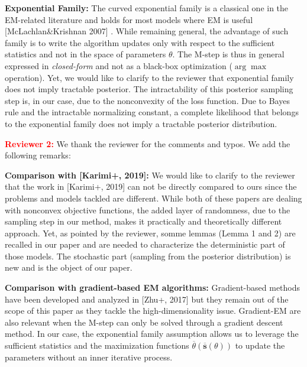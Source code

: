 \documentclass{article}
\begin{document}

\textbf{Exponential Family:} 
The curved exponential family is a classical one in the EM-related literature and holds for most models where  EM is useful [McLachlan\&Krishnan 2007] . 
While remaining general, the advantage of such family is to write the algorithm updates only with respect to the sufficient statistics and not in the space of parameters $\theta$. 
The M-step is thus in general expressed in \emph{closed-form} and not as a black-box optimization ($\arg\max$ operation).
Yet, we would like to clarify to the reviewer that exponential family does not imply tractable posterior. 
The intractability of this posterior sampling step is, in our case, due to the nonconvexity of the loss function. 
Due to Bayes rule and the intractable normalizing constant, a complete likelihood that belongs to the exponential family does not imply a tractable posterior distribution.


\textbf{\textcolor{red}{Reviewer 2:}} We thank the reviewer for the comments and typos. We add the following remarks:

\textbf{Comparison with [Karimi+, 2019]:} 
We would like to clarify to the reviewer that the work in [Karimi+, 2019] can not be directly compared to ours since the problems and models tackled are different. 
While both of these papers are dealing with nonconvex objective functions, the added layer of randomness, due to the sampling step in our method, makes it practically and theoretically different approach.
Yet, as pointed by the reviewer, somme lemmas (Lemma 1 and 2) are recalled in our paper and are needed to characterize the deterministic part of those models. The stochastic part (sampling from the posterior distribution) is new and is the object of our paper.

\textbf{Comparison with gradient-based EM algorithms:} Gradient-based methods have been developed and analyzed in [Zhu+, 2017] but they remain out of the scope of this paper as they tackle the high-dimensionality issue. 
Gradient-EM are also relevant when the M-step can only be solved through a gradient descent method. In our case, the exponential family assumption allows us to leverage the sufficient statistics and the maximization functions $ \overline{\theta}( \overline{\textbf{s}}(\theta) )$ to update the parameters without an inner iterative process.
\end{document}
